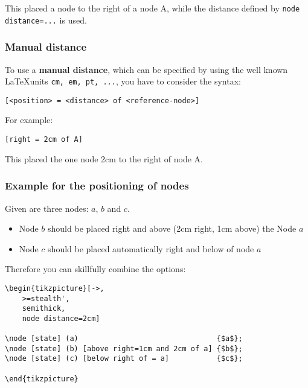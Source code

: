\documentclass[../../../include/open-logic-chapter]{subfiles}
\begin{document}
		This placed a node to the right of a node A, while the distance defined by \texttt{node distance=...} is used.
		\subsubsection{Manual distance}
		To use a \textbf{manual distance}, which can be specified by using the well known \LaTeX units \texttt{cm, em, pt, ...}, you have to consider the syntax:\\

			\begin{lstlisting}[caption={Syntax for the manual positioning of nodes.}]
[<position> = <distance> of <reference-node>]
			\end{lstlisting}

		For example:\\

			\begin{lstlisting}[mathescape,caption={Manual positioning of a node right of A}]
[right = 2cm of A]
			\end{lstlisting}

		This placed the one node 2cm to the right of node A.
		\subsubsection{Example for the positioning of nodes}
		Given are three nodes: $a$, $b$ and $c$.
		\begin{itemize}
			\item Node $b$ should be placed right and above (2cm right, 1cm above) the Node $a$
			\item Node $c$ should be placed automatically right and below of node $a$
		\end{itemize}
		Therefore you can skillfully combine the options:\\

			\begin{lstlisting}[mathescape,caption={Combination of options for the positioning.}]
\begin{tikzpicture}[->,
	>=stealth',
	semithick,
	node distance=2cm]

\node [state] (a)                                {$a$};
\node [state] (b) [above right=1cm and 2cm of a] {$b$};
\node [state] (c) [below right of = a]           {$c$};

\end{tikzpicture}
			\end{lstlisting}
\end{document}
